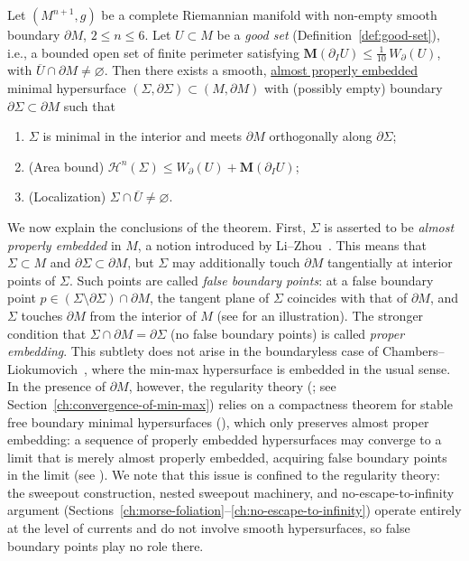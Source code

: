 \begin{theorem}\label{thm:main}
Let $(M^{n+1}, g)$ be a complete Riemannian manifold with non-empty smooth boundary $\partial M$, $2 \leq n \leq 6$.  Let $U \subset M$ be a \emph{good set} (Definition~\ref{def:good-set}), i.e., a bounded open set of finite perimeter satisfying $\mathbf{M}(\partial_I U) \leq \frac{1}{10}\, W_\partial(U)$, with $\overline{U} \cap \partial M \neq \varnothing$.  Then there exists a smooth, \underline{almost properly embedded} minimal hypersurface $(\Sigma,\partial\Sigma)\subset(M,\partial M)$ with (possibly empty) boundary $\partial\Sigma\subset\partial M$ such that
\begin{enumerate}[label=\textup{(\roman*)}]
    \item $\Sigma$ is minimal in the interior and meets $\partial M$ orthogonally along $\partial\Sigma$;
    \item \textup{(Area bound)} $\mathcal{H}^n(\Sigma)\le W_\partial(U)+\mathbf{M}(\partial_IU)$;
    \item \textup{(Localization)} $\Sigma\cap\overline{U}\neq\varnothing$.
\end{enumerate}
\end{theorem}

We now explain the conclusions of the theorem. First, $\Sigma$ is asserted to be \emph{almost properly embedded} in $M$, a notion introduced by Li--Zhou~\cite{LZ17}. This means that $\Sigma \subset M$ and $\partial\Sigma \subset \partial M$, but $\Sigma$ may additionally touch $\partial M$ tangentially at interior points of $\Sigma$. Such points are called \emph{false boundary points}: at a false boundary point $p \in (\Sigma \setminus \partial\Sigma) \cap \partial M$, the tangent plane of $\Sigma$ coincides with that of $\partial M$, and $\Sigma$ touches $\partial M$ from the interior of $M$ (see \cite[Figure~1]{LZ17} for an illustration). The stronger condition that $\Sigma \cap \partial M = \partial\Sigma$ (no false boundary points) is called \emph{proper embedding}. This subtlety does not arise in the boundaryless case of Chambers--Liokumovich~\cite{CL20}, where the min-max hypersurface is embedded in the usual sense. In the presence of $\partial M$, however, the regularity theory (\cite[Theorem~6.2]{LZ17}; see Section~\ref{ch:convergence-of-min-max}) relies on a compactness theorem for stable free boundary minimal hypersurfaces (\cite[Theorem~2.13]{LZ17}), which only preserves almost proper embedding: a sequence of properly embedded hypersurfaces may converge to a limit that is merely almost properly embedded, acquiring false boundary points in the limit (see \cite[Figure~2]{LZ17}). We note that this issue is confined to the regularity theory: the sweepout construction, nested sweepout machinery, and no-escape-to-infinity argument (Sections~\ref{ch:morse-foliation}--\ref{ch:no-escape-to-infinity}) operate entirely at the level of currents and do not involve smooth hypersurfaces, so false boundary points play no role there.

